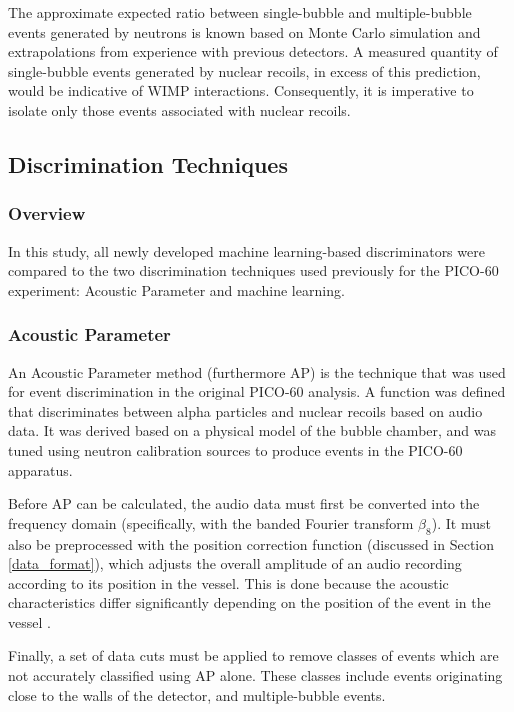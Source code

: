 \documentclass[10pt]{article}
\begin{document}
The approximate expected ratio between single-bubble and multiple-bubble events generated by neutrons is known based on Monte Carlo simulation and extrapolations from experience with previous detectors. A measured quantity of single-bubble events generated by nuclear recoils, in excess of this prediction, would be indicative of WIMP interactions. Consequently, it is imperative to isolate only those events associated with nuclear recoils.

\subsection{Discrimination Techniques} \label{discrimination_techniques}

\subsubsection{Overview}

In this study, all newly developed machine learning-based discriminators were compared to the two discrimination techniques used previously for the PICO-60 experiment: Acoustic Parameter and machine learning.

\subsubsection{Acoustic Parameter}

An Acoustic Parameter method (furthermore AP) is the technique that was used for event discrimination in the original PICO-60 analysis. A function was defined that discriminates between alpha particles and nuclear recoils based on audio data. It was derived based on a physical model of the bubble chamber, and was tuned using neutron calibration sources to produce events in the PICO-60 apparatus.

Before AP can be calculated, the audio data must first be converted into the frequency domain (specifically, with the banded Fourier transform $\beta_{8}$). It must also be preprocessed with the position correction function (discussed in Section \ref{data_format}), which adjusts the overall amplitude of an audio recording according to its position in the vessel. This is done because the acoustic characteristics differ significantly depending on the position of the event in the vessel \cite{pico}.

Finally, a set of data cuts must be applied to remove classes of events which are not accurately classified using AP alone. These classes include events originating close to the walls of the detector, and multiple-bubble events.
\end{document}
